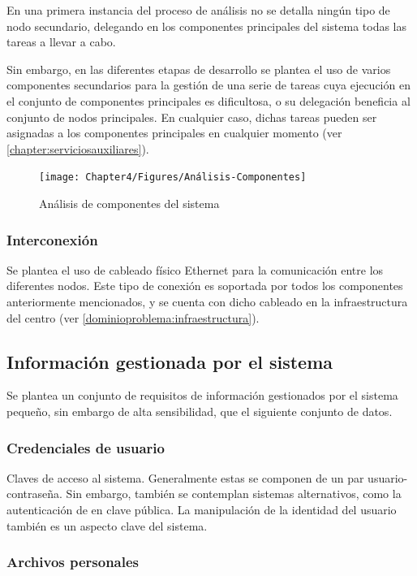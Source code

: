 En una primera instancia del proceso de análisis no se detalla ningún tipo de nodo secundario, delegando en los componentes principales del sistema todas las tareas a llevar a cabo.

Sin embargo, en las diferentes etapas de desarrollo se plantea el uso de varios componentes secundarios para la gestión de una serie de tareas cuya ejecución en el conjunto de componentes principales es dificultosa, o su delegación beneficia al conjunto de nodos principales. En cualquier caso, dichas tareas pueden ser asignadas a los componentes principales en cualquier momento (ver \ref{chapter:serviciosauxiliares}).

\begin{figure}[H]
  \centering
  \texttt{[image: Chapter4/Figures/Análisis-Componentes]}
  \caption[Análisis de componentes]{Análisis de componentes del sistema}
  \label{analisis:componentes}
\end{figure}

\subsubsection{Interconexión}

Se plantea el uso de cableado físico Ethernet para la comunicación entre los diferentes nodos. Este tipo de conexión es soportada por todos los componentes anteriormente mencionados, y se cuenta con dicho cableado en la infraestructura del centro (ver \ref{dominioproblema:infraestructura}).

\subsection{Información gestionada por el sistema}

Se plantea un conjunto de requisitos de información gestionados por el sistema pequeño, sin embargo de alta sensibilidad, que el siguiente conjunto de datos.

\subsubsection{Credenciales de usuario}

Claves de acceso al sistema. Generalmente estas se componen de un par usuario-contraseña. Sin embargo, también se contemplan sistemas alternativos, como la autenticación de en clave pública. La manipulación de la identidad del usuario también es un aspecto clave del sistema.

\subsubsection{Archivos personales}

